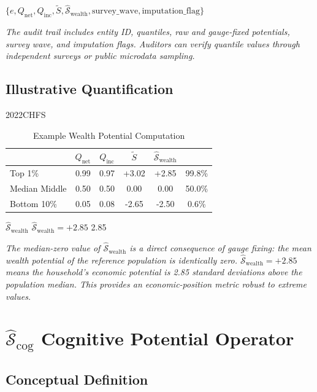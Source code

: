 \documentclass[11pt,a4paper]{article}
\theoremstyle{definition}
\newcommand{\Sopwealth}{\hat{\mathcal{S}}_{\text{wealth}}}
\newcommand{\Sopcog}{\hat{\mathcal{S}}_{\text{cog}}}
\begin{document}
\noindent $\{e, Q_{\text{net}}, Q_{\text{inc}}, \tilde{S}, \Sopwealth, \text{survey\_wave}, \text{imputation\_flag}\}$

\textit{The audit trail includes entity ID, quantiles, raw and gauge-fixed potentials, survey wave, and imputation flags. Auditors can verify quantile values through independent surveys or public microdata sampling.}

\subsection{ Illustrative Quantification}

2022CHFS

\begin{table}[htbp]
\centering
\caption{ Example Wealth Potential Computation}
\label{tab:wealth-example}
\begin{tabular}{@{}lccccc@{}}
\toprule
\textbf{} & $Q_{\text{net}}$ & $Q_{\text{inc}}$ & $\tilde{S}$ & $\Sopwealth$ &  \\
\midrule
 Top 1\% & 0.99 & 0.97 & +3.02 & +2.85 & 99.8\% \\
 Median Middle & 0.50 & 0.50 & 0.00 & 0.00 & 50.0\% \\
 Bottom 10\% & 0.05 & 0.08 & -2.65 & -2.50 & 0.6\% \\
\bottomrule
\end{tabular}
\end{table}

\noindent $\Sopwealth$ 
$\Sopwealth = +2.85$ 
2.85

\medskip
\noindent\textit{The median-zero value of $\Sopwealth$ is a direct consequence of gauge fixing: the mean wealth potential of the reference population is identically zero. $\Sopwealth = +2.85$ means the household's economic potential is 2.85 standard deviations above the population median. This provides an economic-position metric robust to extreme values.}

\section{ $\Sopcog$ Cognitive Potential Operator}

\subsection{ Conceptual Definition}
\end{document}
